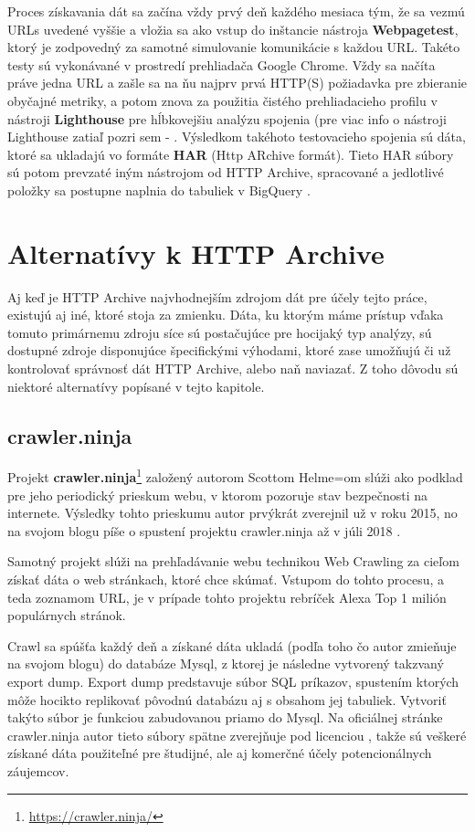 {Proces získavania dát sa začína vždy prvý deň každého mesiaca tým, že sa vezmú URLs uvedené vyššie a vložia sa ako vstup do inštancie nástroja 
\textbf{Webpagetest}, ktorý je zodpovedný za samotné simulovanie komunikácie s 
každou URL. Takéto testy sú vykonávané v prostredí prehliadača Google Chrome.
Vždy sa načíta práve jedna URL a zašle sa na ňu najprv prvá HTTP(S) požiadavka pre zbieranie obyčajné metriky, a potom znova za použitia čistého prehliadacieho profilu v nástroji \textbf{Lighthouse} pre hĺbkovejšiu analýzu spojenia (pre viac info o nástroji Lighthouse zatiaľ pozri sem - . Výsledkom takéhoto testovacieho spojenia sú dáta, ktoré sa ukladajú vo formáte \textbf{HAR} (Http ARchive formát). Tieto HAR súbory sú potom prevzaté iným nástrojom od HTTP Archive, spracované a jedlotlivé položky sa postupne naplnia do tabuliek v BigQuery .


\section{Alternatívy k HTTP Archive}

Aj keď je HTTP Archive najvhodnejším zdrojom dát pre účely tejto práce, existujú aj iné, ktoré stoja za zmienku.
Dáta, ku ktorým máme prístup vďaka tomuto primárnemu zdroju síce sú postačujúce pre hocijaký typ analýzy, sú dostupné zdroje disponujúce špecifickými výhodami, ktoré
zase umožňujú či už kontrolovať správnosť dát HTTP Archive, alebo naň naviazať.
Z toho dôvodu sú niektoré alternatívy popísané v tejto kapitole.

\subsection{crawler.ninja}

Projekt \textbf{crawler.ninja}\footnote{\href{https://crawler.ninja/}{https://crawler.ninja/}} založený autorom Scottom Helme=om slúži ako podklad pre jeho periodický prieskum
webu, v ktorom pozoruje stav bezpečnosti na internete. Výsledky tohto prieskumu autor prvýkrát zverejnil už v roku 2015, no na svojom blogu píše o spustení projektu crawler.ninja až v júli
2018 \cite{crawler-ninja}. 

Samotný projekt slúži na prehľadávanie webu technikou Web Crawling za cieľom získať dáta o web stránkach, ktoré chce skúmať.
Vstupom do tohto procesu, a teda zoznamom URL, je v prípade tohto projektu rebríček Alexa Top 1 milión populárnych stránok.

Crawl sa spúšťa každý deň a získané dáta ukladá (podľa toho čo autor zmieňuje na svojom blogu) do databáze Mysql, z ktorej je následne vytvorený takzvaný export dump.
Export dump predstavuje súbor SQL príkazov, spustením ktorých môže hocikto replikovať pôvodnú databázu aj s obsahom jej tabuliek. Vytvoriť takýto súbor je funkciou zabudovanou priamo do Mysql.
Na oficiálnej stránke crawler.ninja autor tieto súbory spätne zverejňuje pod licenciou , takže sú veškeré získané dáta použiteľné pre študijné, ale aj komerčné účely potencionálnych záujemcov.

}
